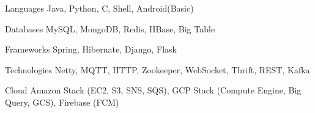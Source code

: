 
\begin{cvskills}
  \cvskill
    {Languages} %
    {Java, Python, C, Shell, Android(Basic)} %

  \cvskill
    {Databases} %
    {MySQL, MongoDB, Redis, HBase, Big Table } %

  \cvskill
    {Frameworks} %
    {Spring, Hibernate, Django, Flask} %

  \cvskill
    {Technologies} %
    {Netty, MQTT, HTTP, Zookeeper, WebSocket, Thrift, REST, Kafka} %

  \cvskill
    {Cloud} %
    {Amazon Stack (EC2, S3, SNS, SQS), GCP Stack (Compute Engine, Big Query, GCS), Firebase (FCM)} %

\end{cvskills}
